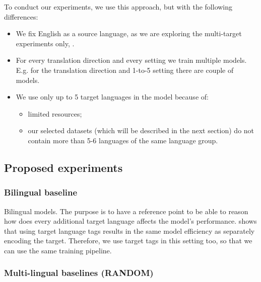 To conduct our experiments, we use this approach, but with the following differences:
\begin{itemize}
	\item We fix English as a source language, as we are exploring the multi-target experiments only, .
	\item For every translation direction and every setting we train multiple models.
	E.g. for the  translation direction and 1-to-5 setting there are
	couple of  models.
	\item We use only up to 5 target languages in the model because of:
	\begin{itemize}
		\item limited resources;
		\item our selected datasets (which will be described in the next section)
		do not contain more than 5-6 languages of the same language group.
	\end{itemize}
\end{itemize}



\subsection{Proposed experiments}
\label{subsection:proposed_experiments}


\subsubsection*{Bilingual \gls{baseline}}

Bilingual models. The purpose is to have a reference point to be able to reason how
does every additional target language affects the model's performance.
 shows that using target language tags results
in the same model efficiency as separately encoding the target.
Therefore, we use target tags in this setting too, so that we can use
the same training pipeline.

\subsubsection*{Multi-lingual baselines (RANDOM)}

